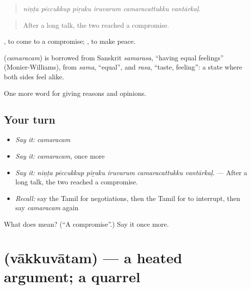 \begin{quote}
\emph{nīṇṭa pēccukkup piṟaku iruvarum camaracattukku vantārkaḷ.}
\end{quote}

\begin{quote}
After a long talk, the two reached a compromise.
\end{quote}

 , to come to a compromise;  , to make peace.

\begin{cousinweb}
\textbf{} (\emph{camaracam}) is borrowed from Sanskrit \emph{samarasa}, \textquotedblleft{}having equal feelings\textquotedblright{} (Monier-Williams), from \emph{sama}, \textquotedblleft{}equal\textquotedblright{}, and \emph{rasa}, \textquotedblleft{}taste, feeling\textquotedblright{}: a state where both sides feel alike.
\end{cousinweb}

\begin{grammarlens}[title={What you've built}]
One more word for giving reasons and opinions.
\end{grammarlens}

\subsection*{Your turn}
\begin{itemize}
\raggedright
  \item \emph{Say it:} \emph{camaracam}
  \item \emph{Say it:} \emph{camaracam}, once more
  \item \emph{Say it:} \emph{nīṇṭa pēccukkup piṟaku iruvarum camaracattukku vantārkaḷ.} — After a long talk, the two reached a compromise.
  \item \emph{Recall:} say the Tamil for negotiations, then the Tamil for to interrupt, then say \emph{camaracam} again
\end{itemize}

\begin{tcolorbox}[breakable,colback=teal!4,colframe=teal!35!black,title={Before you move on}]
What does  mean? (\textquotedblleft{}A compromise\textquotedblright{}.) Say it once more.
\end{tcolorbox}
\section[\texorpdfstring{\ta{வாக்குவாதம்} (vākkuvātam)}{வாக்குவாதம் (vākkuvātam)}]{ (vākkuvātam) — a heated argument; a quarrel}

